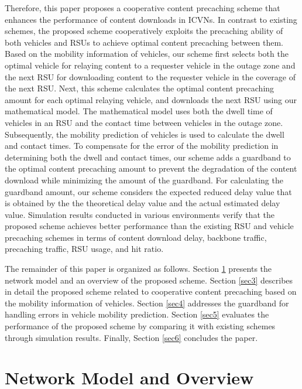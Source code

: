 \documentclass[electronics,aricle,accept,pdftex,moreauthors]{Definitions/mdpi}
\begin{document}
Therefore, this paper proposes a cooperative content precaching scheme that enhances the performance of content downloads in ICVNs. In contrast to existing schemes, the proposed scheme cooperatively exploits the precaching ability of both vehicles and RSUs to achieve optimal content precaching between them. Based on the mobility information of vehicles, our scheme first selects both the optimal vehicle for relaying content to a requester vehicle in the outage zone and the next RSU for downloading content to the requester vehicle in the coverage of the next RSU. Next, this scheme calculates the optimal content precaching amount for each optimal relaying vehicle, and downloads the next RSU using our mathematical model. The mathematical model uses both the dwell time of vehicles in an RSU and the contact time between vehicles in the outage zone. Subsequently, the mobility prediction of vehicles is used to calculate the dwell and contact times. To compensate for the error of the mobility prediction in determining both the dwell and contact times, our scheme adds a guardband to the optimal content precaching amount to prevent the degradation of the content download while minimizing the amount of the guardband. For calculating the guardband amount, our scheme considers the expected reduced delay value that is obtained by the the theoretical delay value and the actual estimated delay value.
Simulation results conducted in various environments verify that the proposed scheme achieves better performance than the existing RSU and vehicle precaching schemes in terms of content download delay, backbone traffic, precaching traffic, RSU usage, and hit ratio.

The remainder of this paper is organized as follows. Section \ref{sec2} presents the network model and an overview of the proposed scheme. Section \ref{sec3} describes in detail the proposed scheme related to cooperative content precaching based on the mobility information of vehicles. Section \ref{sec4} addresses the guardband for handling errors in vehicle mobility prediction. Section \ref{sec5} evaluates the performance of the proposed scheme by comparing it with existing schemes through simulation results. Finally, Section \ref{sec6} concludes the paper.


\section{Network Model and Overview} \label{sec2}
\end{document}

